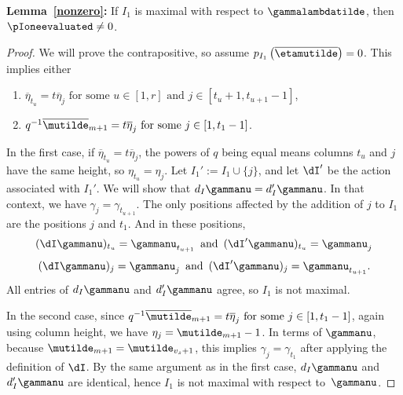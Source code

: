 \textbf{Lemma~\ref{nonzero}:} If $I_1$ is maximal with respect to $\gammalambdatilde$, then $\pIoneevaluated \neq 0$.

\begin{proof}
We will prove the contrapositive, so assume $p_{I_1}\left( \overline{\etamutilde}\right) = 0$. This implies either \begin{enumerate} \item $\overline{\eta}_{t_u} = t \overline{\eta}_j \text{ for some } u\in [1,r] \text{ and } j\in [t_u+1,t_{u+1}-1]$,  \item $ q^{-1} \overline{\mutilde}_{m+1} = t \overline{\eta}_j \text{ for some } j \in [1,t_1-1]$.
 \end{enumerate}
 In the first case, if $\overline{\eta}_{t_u} = t\overline{\eta}_j$, the powers of $q$ being equal means columns $t_u$ and $j$ have the same height, so $\eta_{t_u} = \eta_j$. Let $I_1' := I_1 \cup \{j\}$, and let $\dI'$ be the action associated with $I_1'$. We will show that $d_I\gammanu = d_I'\gammanu$. In that context, we have $\gamma_j = \gamma_{t_{u+1}}$. The only positions affected by the addition of $j$ to $I_1$ are the positions $j$ and $t_1$. And in these positions,
 \[ (\dI \gammanu)_{t_u} = \gammanu_{t_{u+1}} \, \text{ and }\,  (\dI' \gammanu)_{t_u} = \gammanu_j\]
 \[ (\dI \gammanu)_{j} = \gammanu_j  \, \text{ and } \, (\dI' \gammanu)_{j} = \gammanu_{t_{u+1}}.\]
 All entries of $d_I\gammanu$ and $d_I'\gammanu$ agree, so $I_1$ is not maximal.
 
 In the second case, since $ q^{-1} \overline{\mutilde}_{m+1} = t \overline{\eta}_j \text{ for some } j \in [1,t_1-1]$, again using column height, we have $\eta_j = \mutilde_{m+1}-1$. In terms of $\gammanu$, because $\mutilde_{m+1} = \mutilde_{v_s+1}$, this implies $\gamma_j = \gamma_{t_1}$ after applying the definition of $\dI$. By the same argument as in the first case, $d_I\gammanu$ and $d_I'\gammanu$ are identical, hence $I_1$ is not maximal with respect to~$\gammanu$.
 \end{proof}

